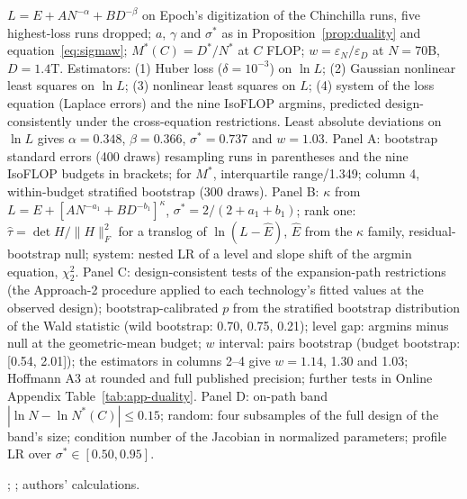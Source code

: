 \begin{table}[tp]
\begin{tablenotes}
$L=E+AN^{-\alpha}+BD^{-\beta}$ on Epoch's digitization of the Chinchilla runs, five highest-loss runs dropped;
$a$, $\gamma$ and $\sigma^*$ as in Proposition~\ref{prop:duality} and equation~\eqref{eq:sigmaw}; $M^*(C)=D^*/N^*$ at
$C$ FLOP; $w=\varepsilon_N/\varepsilon_D$ at $N=70$B, $D=1.4$T. Estimators: (1) Huber loss ($\delta=10^{-3}$) on
$\ln L$; (2) Gaussian nonlinear least squares on $\ln L$; (3) nonlinear least squares on $L$; (4) system of the loss
equation (Laplace errors) and the nine IsoFLOP argmins, predicted design-consistently under the cross-equation
restrictions. Least absolute deviations on $\ln L$ gives $\alpha=0.348$, $\beta=0.366$, $\sigma^*=0.737$ and $w=1.03$.
Panel A: bootstrap standard errors (400 draws) resampling runs in parentheses and the nine IsoFLOP budgets in
brackets; for $M^*$, interquartile range/1.349; column 4, within-budget stratified bootstrap (300 draws).
Panel B: $\kappa$ from $L=E+[AN^{-a_1}+BD^{-b_1}]^{\kappa}$, $\sigma^*=2/(2+a_1+b_1)$;
rank one: $\hat\tau=\det H/\lVert H\rVert_F^2$ for a translog of $\ln(L-\hat E)$, $\hat E$ from the $\kappa$ family,
residual-bootstrap null; system: nested LR of a level and slope shift of the argmin equation, $\chi^2_2$. Panel C:
design-consistent tests of the expansion-path restrictions (the Approach-2 procedure applied to each technology's
fitted values at the observed design); bootstrap-calibrated $p$ from the stratified bootstrap distribution of the Wald
statistic (wild bootstrap: 0.70, 0.75, 0.21); level gap: argmins minus null at the geometric-mean budget; $w$ interval:
pairs bootstrap (budget bootstrap: [0.54, 2.01]); the estimators in columns 2--4 give $w=1.14$, 1.30 and 1.03; Hoffmann A3 at rounded and full published precision; further tests in Online Appendix
Table~\ref{tab:app-duality}. Panel D: on-path band
$|\ln N-\ln N^*(C)|\le0.15$; random: four subsamples of the full design of the band's size; condition number of the
Jacobian in normalized parameters; profile LR over $\sigma^*\in[0.50,0.95]$.
\end{tablenotes}

\begin{tablenotes}[Source]
\citet{hoffmann2022training}; \citet{besiroglu2024chinchilla}; authors' calculations.
\end{tablenotes}
\end{table}
